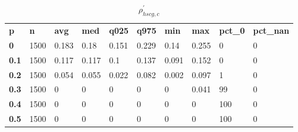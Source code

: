 \begin{table}[h]
 \centering 
\footnotesize
\caption{$\rho_{hscg,c}^\prime $}
\label{tab:alphahscgc}
\begin{tabular}[h]{| l l l l l l l l l l|
    } \hline
\textbf{ p} & \textbf{ n} & \textbf{ avg} & \textbf{ med} & \textbf{ q025} & \textbf{ q975} & \textbf{ min} & \textbf{ max} & \textbf{ pct\_0} & \textbf{ pct\_nan}
           \\
  \textbf{  0} & 1500 & 0.183 &  0.18 & 0.151 & 0.229 &  0.14 & 0.255 &   0 & 0
           \\
  \textbf{0.1} & 1500 & 0.117 & 0.117 &   0.1 & 0.137 & 0.091 & 0.152 &   0 & 0
           \\
  \textbf{0.2} & 1500 & 0.054 & 0.055 & 0.022 & 0.082 & 0.002 & 0.097 &   1 & 0
           \\
  \textbf{0.3} & 1500 &     0 &     0 &     0 &     0 &     0 & 0.041 &  99 & 0
           \\
  \textbf{0.4} & 1500 &     0 &     0 &     0 &     0 &     0 &     0 & 100 & 0
           \\
  \textbf{0.5} & 1500 &     0 &     0 &     0 &     0 &     0 &     0 & 100 & 0
           \\
 \hline \end{tabular}
 \end{table}

